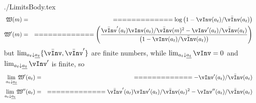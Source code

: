 \newcommand{\textname}{./Appendices/Limits}\documentclass{\econtex} \newcommand{\Mma}{{\it Mathematica}}
\begin{document}
 \large 
\begin{verbatimwrite}{./LimitsBody.tex}
\newcommand{\vPF}{\bar{\vInv}}
\newcommand{\cPF}{\bar{\cFunc}}
\newcommand{\W}{\mathfrak{W}}
\newcommand{\at}{a_{t}}
\newcommand{\atDown}{\lim_{\at \downarrow \underline{\at}}}
  \begin{equation}\begin{gathered}\begin{aligned}
    \W(m)              & = &  =  =  =  =  =  =  =  =  =  =  =  =  = \log \left(1-\vInv(\at)/\vPF(\at)\right) 
\\ \W^{\prime}(m)              & = &  =  =  =  =  =  =  =  =  =  =  =  =  = \left(\frac{\vPF^{\prime}(\at)\vInv(\at)/\vPF(m)^2-\vInv^{\prime}(\at)/\vPF(\at)}{\left(1-\vInv(\at)/\vPF(\at)\right) }\right)
  \end{aligned}\end{gathered}\end{equation}
but $\atDown \{\vPF,\vPF^{\prime}\}$ are finite numbers, while $\atDown \vInv = 0$ and $\atDown \vInv^{\prime}$ is finite, so
  \begin{equation}\begin{gathered}\begin{aligned}
   \atDown \W^{\prime}(\at)              & = &  =  =  =  =  =  =  =  =  =  =  =  =  = -\vInv^{\prime}(\at)/\vPF(\at)
\\ \atDown \W^{\prime\prime}(\at)              & = &  =  =  =  =  =  =  =  =  =  =  =  =  = \vPF^{\prime}(\at)\vInv^{\prime}(\at)/\vPF(\at)^{2}-\vInv^{\prime\prime}(\at)/\vPF(\at  )
  \end{aligned}\end{gathered}\end{equation}


\end{verbatimwrite}



\end{document}

